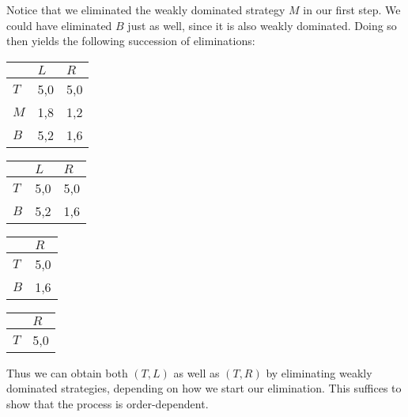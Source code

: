 \documentclass[10pt,a4paper]{article}
\begin{document}
Notice that we eliminated the weakly dominated strategy $M$ in our first step. We could have eliminated $B$ just as well, since it is also weakly dominated. Doing so then yields the following succession of eliminations:

\begin{table}[h]
\begin{tabular}{|l|l|l|}
\hline
          & $L$ & $R$  \\ \hline
$T$     & 5,0   & 5,0 \\ \hline
$M$     & 1,8 & 1,2  \\ \hline
$B$		& 5,2	& 1,6 \\ \hline
\end{tabular}
\end{table}

\begin{table}[h]
\begin{tabular}{|l|l|l|}
\hline
          & $L$ & $R$  \\ \hline
$T$     & 5,0   & 5,0 \\ \hline
$B$     & 5,2 & 1,6  \\ \hline
\end{tabular}
\end{table}

\begin{table}[h]
\begin{tabular}{|l|l|}
\hline
          & $R$\\ \hline
$T$     & 5,0 \\ \hline
$B$     & 1,6\\ \hline
\end{tabular}
\end{table}

\begin{table}[h]
\begin{tabular}{|l|l|}
\hline
          & $R$\\ \hline
$T$     & 5,0 \\ \hline
\end{tabular}
\end{table} 

Thus we can obtain both $(T,L)$ as well as $(T,R)$ by eliminating weakly dominated strategies, depending on how we start our elimination. This suffices to show that the process is order-dependent.
\end{document}

